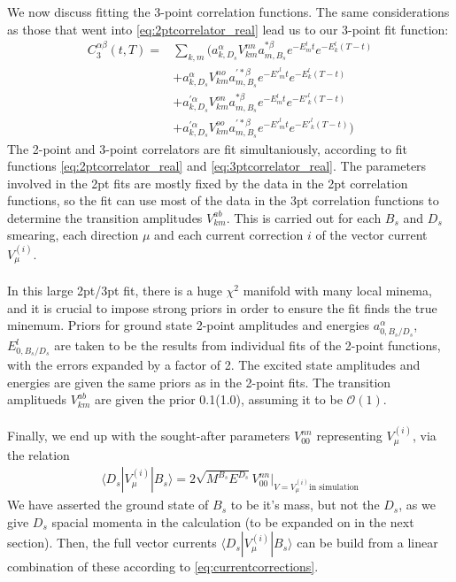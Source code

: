 \documentclass[a4paper,10pt]{article}
\numberwithin{equation}{section}
\begin{document}
\\ \\
We now discuss fitting the 3-point correlation functions. The same considerations as those that went into \eqref{eq:2ptcorrelator_real} lead us to our 3-point fit function:
\begin{align}
	\nonumber
	C^{\alpha\beta}_3(t,T) =& \sum_{k,m} \big( a_{k,D_s}^{\alpha} V^{nn}_{km} a_{m,B_s}^{*\beta} e^{-E^l_m t} e^{-E^l_k (T-t)} \\
	\nonumber
	& + a_{k,D_s}^{\alpha} V^{no}_{km} a_{m,B_s}^{'*\beta} e^{-E'^l_m t} e^{-E^l_k (T-t)} \\
	\nonumber
	& + a_{k,D_s}^{'\alpha} V^{on}_{km} a_{m,B_s}^{*\beta} e^{-E^l_m t} e^{-E'^l_k (T-t)} \\
	& + a_{k,D_s}^{'\alpha} V^{oo}_{km} a_{m,B_s}^{'*\beta} e^{-E'^l_m t} e^{-E'^l_k (T-t)} \big)
	\label{eq:3ptcorrelator_real}
\end{align}
The 2-point and 3-point correlators are fit simultaniously, according to fit functions \eqref{eq:2ptcorrelator_real} and \eqref{eq:3ptcorrelator_real}. The parameters involved in the 2pt fits are mostly fixed by the data in the 2pt correlation functions, so the fit can use most of the data in the 3pt correlation functions to determine the transition amplitudes $V^{ab}_{km}$. This is carried out for each $B_s$ and $D_s$ smearing, each direction $\mu$ and each current correction $i$ of the vector current $V^{(i)}_{\mu}$.
\\ \\
In this large 2pt/3pt fit, there is a huge $\chi^2$ manifold with many local minema, and it is crucial to impose strong priors in order to ensure the fit finds the true minemum. Priors for ground state 2-point amplitudes and energies $a_{0,B_s/D_s}^{\alpha}$,$E^l_{0,B_s/D_s}$ are taken to be the results from individual fits of the 2-point functions, with the errors expanded by a factor of 2. The excited state amplitudes and energies are given the same priors as in the 2-point fits. The transition amplitueds $V^{ab}_{km}$ are given the prior 0.1(1.0), assuming it to be $\mathcal{O}(1)$.
\\ \\
Finally, we end up with the sought-after parameters $V_{00}^{nn}$ representing $V_{\mu}^{(i)}$, via the relation
\begin{align}
	\langle D_s | V^{(i)}_{\mu} | B_s \rangle =  2\sqrt{M^{B_s} E^{D_s}} V_{00}^{nn} |_{V=V_{\mu}^{(i)}\text{in simulation}}
\end{align}
We have asserted the ground state of $B_s$ to be it's mass, but not the $D_s$, as we give $D_s$ spacial momenta in the calculation (to be expanded on in the next section). Then, the full vector currents $\langle D_s | V^{(i)}_{\mu} | B_s \rangle$ can be build from a linear combination of these according to \ref{eq:currentcorrections}.
\end{document}

